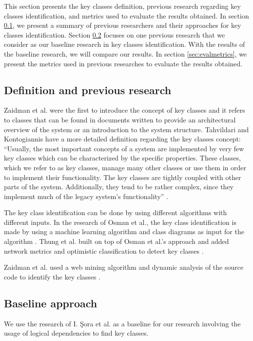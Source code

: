 \documentclass[runningheads]{comsis2}
\begin{document}
This section presents the key classes definition, previous research regarding key classes identification, and metrics used to evaluate the results obtained.
In section \ref{sec:keyclass_definition}, we present a summary of previous researchers and their approaches for key classes identification. Section \ref{sec:baseline_approach_sub} focuses on one previous research that we consider as our baseline research in key classes identification. With the results of the baseline research, we will compare our results. 
In section \ref{sec:evalmetrics}, we present the metrics used in previous researches to evaluate the results obtained. 

\subsection{Definition and previous research}
\label{sec:keyclass_definition}

Zaidman et al. \cite{ZaidmanJurnal} were the first to introduce the concept of key classes and it refers to classes that can be found in documents written to provide an architectural overview of the system or an introduction to the system structure.
Tahvildari and Kontogiannis have a more detailed definition regarding the key classes concept: “Usually, the most important concepts of a system are implemented by very few key classes which can be characterized by the specific properties. These classes, which we refer to as key classes, manage many other classes or use them in order to implement their functionality. The key classes are tightly coupled with other parts of the system. Additionally, they tend to be rather complex, since they implement much of the legacy system’s functionality” \cite{Tahvildari2004ImprovingDQ}.


The key class identification can be done by using different algorithms with different inputs. In the research of Osman et al., the key class identification is made by using a machine learning algorithm and class diagrams as input for the algorithm \cite{6676885}. Thung et al. built on top of Osman et al.’s approach and added network metrics and optimistic classification to detect key classes \cite{rocclasification}.

Zaidman et al. used a web mining algorithm and dynamic analysis of the source code to identify the key classes \cite{ZaidmanJurnal}.

\subsection{Baseline approach}
\label{sec:baseline_approach_sub}
We use the research of I. Şora et al. \cite{Finding-key-classes} as a baseline for our research involving the usage of logical dependencies to find key classes. 
\end{document}

